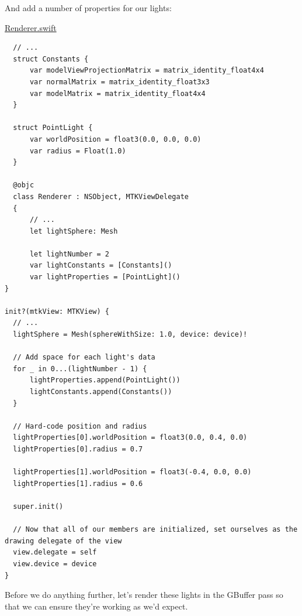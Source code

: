 \documentclass[11pt]{article}
\begin{document}
And add a number of properties for our lights:

\uline{Renderer.swift}
\begin{verbatim}
  // ...
  struct Constants {
      var modelViewProjectionMatrix = matrix_identity_float4x4
      var normalMatrix = matrix_identity_float3x3
      var modelMatrix = matrix_identity_float4x4
  }

  struct PointLight {
      var worldPosition = float3(0.0, 0.0, 0.0)
      var radius = Float(1.0)
  }

  @objc
  class Renderer : NSObject, MTKViewDelegate
  {
      // ...
      let lightSphere: Mesh

      let lightNumber = 2
      var lightConstants = [Constants]()
      var lightProperties = [PointLight]()
}

init?(mtkView: MTKView) {
  // ...
  lightSphere = Mesh(sphereWithSize: 1.0, device: device)!

  // Add space for each light's data
  for _ in 0...(lightNumber - 1) {
      lightProperties.append(PointLight())
      lightConstants.append(Constants())
  }

  // Hard-code position and radius
  lightProperties[0].worldPosition = float3(0.0, 0.4, 0.0)
  lightProperties[0].radius = 0.7

  lightProperties[1].worldPosition = float3(-0.4, 0.0, 0.0)
  lightProperties[1].radius = 0.6

  super.init()

  // Now that all of our members are initialized, set ourselves as the drawing delegate of the view
  view.delegate = self
  view.device = device
}
\end{verbatim}

Before we do anything further, let's render these lights in the GBuffer pass so
that we can ensure they're working as we'd expect.
\end{document}
